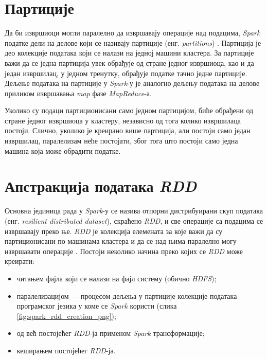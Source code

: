 \documentclass[12pt,oneside]{memoir}
\begin{document}
\section{Партиције}
\label{sec:spark_partic}

Да би извршиоци могли паралелно да извршавају операције над подацима, \textit{Spark} податке дели на делове који се називају партиције (енг. \textit{partitions}) \cite{spark_guide}. Партиција је део колекције података који се налази на једној машини кластера. За партиције важи да се једна партиција увек обрађује од стране једног извршиоца, као и да један извршилац, у једном тренутку, обрађује податке тачно једне партиције. Дељење података на партиције у \textit{Spark}-у је аналогно дељењу података на делове  приликом извршавања \textit{map} фазе \textit{MapReduce}-а.



Уколико су подаци партиционисани само једном партицијом, биће обрађени од стране једног извршиоца у кластеру, независно од тога колико извршилаца постоји. Слично, уколико је креирано више партиција, али постоји само један извршилац, паралелизам неће постојати, због тога што постоји само једна машина која може обрадити податке.

\section{Апстракција података \textit{RDD}}
\label{sec:spark_rdd}

Основна јединица рада у \textit{Spark}-у се назива отпорни дистрибуирани скуп података (енг. \textit{resilient distributed dataset}), скраћено \textit{RDD}, и све операције са подацима се извршавају преко ње. \textit{RDD} је колекција елемената за које важи да су партиционисани по машинама кластера и да се над њима паралелно могу извршавати операције \cite{spark_rdd}. Постоји неколико начина преко којих се \textit{RDD} може креирати:

\begin{itemize}
\item читањем фајла који се налази на фајл систему (обично \textit{HDFS});
\item паралелизацијом --- процесом дељења у партиције колекције података програмског језика у коме се \textit{Spark} користи (слика \ref{fig:spark_rdd_creation_png});
\item од већ постојећег \textit{RDD}-ја применом \textit{Spark} трансформације;
\item кеширањем постојећег \textit{RDD}-ја.
\end{itemize}
\end{document}
